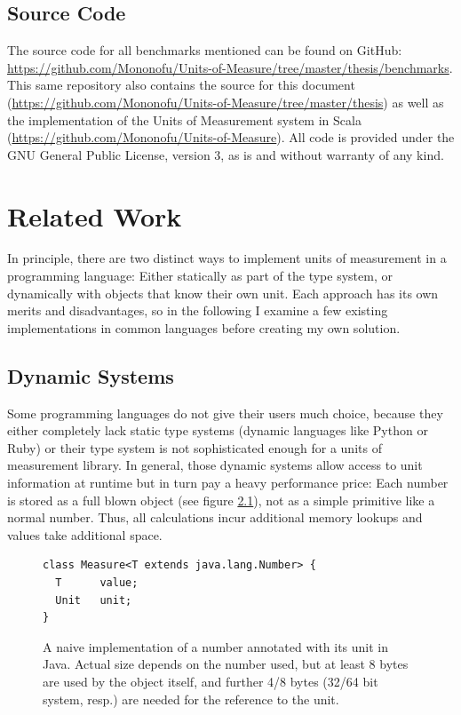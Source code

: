 \documentclass[12pt,oneside,a4paper]{scrbook}
\theoremstyle{definition}
\begin{document}
\section{Source Code}
The source code for all benchmarks mentioned can be found on GitHub: \url{https://github.com/Mononofu/Units-of-Measure/tree/master/thesis/benchmarks}. This same repository also contains the source for this document (\url{https://github.com/Mononofu/Units-of-Measure/tree/master/thesis}) as well as the implementation of the Units of Measurement system in Scala (\url{https://github.com/Mononofu/Units-of-Measure}). All code is provided under the GNU General Public License, version 3, as is and without warranty of any kind.

\chapter{Related Work}

In principle, there are two distinct ways to implement units of measurement in a programming language: Either statically as part of the type system, or dynamically with objects that know their own unit. Each approach has its own merits and disadvantages, so in the following I examine a few existing implementations in common languages before creating my own solution.

\section{Dynamic Systems}

Some programming languages do not give their users much choice, because they either completely lack static type systems (dynamic languages like Python or Ruby) or their type system is not sophisticated enough for a units of measurement library. In general, those dynamic systems allow access to unit information at runtime but in turn pay a heavy performance price: Each number is stored as a full blown object (see figure \ref{code:naive_java_measure}), not as a simple primitive like a normal number. Thus, all calculations incur additional memory lookups and values take additional space.

\begin{figure}
\begin{verbatim}
class Measure<T extends java.lang.Number> {
  T      value;
  Unit   unit;
}
\end{verbatim}
\caption{A naive implementation of a number annotated with its unit in Java. Actual size depends on the number used, but at least 8 bytes are used by the object itself, and further 4/8 bytes (32/64 bit system, resp.) are needed for the reference to the unit.}
\label{code:naive_java_measure}
\end{figure}
\end{document}

